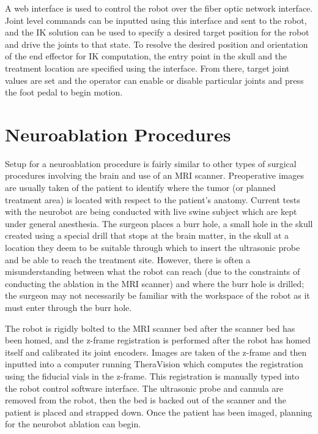 \documentclass[12pt]{report}
\makeatletter
\renewcommand{\todo}[2][]{%
    \@todo[caption={#2}, #1]{\begin{spacing}{0.5}#2\end{spacing}}%
}
\makeatother
\begin{document}
A web interface is used to control the robot over the fiber optic network interface. Joint level commands can be inputted using this interface and sent to the robot, and the IK solution can be used to specify a desired target position for the robot and drive the joints to that state. To resolve the desired position and orientation of the end effector for IK computation, the entry point in the skull and the treatment location are specified using the interface. From there, target joint values are set and the operator can enable or disable particular joints and press the foot pedal to begin motion.


\section{Neuroablation Procedures}
\label{sec:neuroablationProcedures}
Setup for a neuroablation procedure is fairly similar to other types of surgical procedures involving the brain and use of an MRI scanner. Preoperative images are usually taken of the patient to identify where the tumor (or planned treatment area) is located with respect to the patient's anatomy. Current tests with the neurobot are being conducted with live swine subject which are kept under general anesthesia. The surgeon places a burr hole, a small hole in the skull created using a special drill that stops at the brain matter, in the skull at a location they deem to be suitable through which to insert the ultrasonic probe and be able to reach the treatment site. However, there is often a misunderstanding between what the robot can reach (due to the constraints of conducting the ablation in the MRI scanner) and where the burr hole is drilled; the surgeon may not necessarily be familiar with the workspace of the robot as it must enter through the burr hole. \todo{GF: please word this [sentence] differently}

The robot is rigidly bolted to the MRI scanner bed after the scanner bed has been homed, and the z-frame registration is performed after the robot has homed itself and calibrated its joint encoders. Images are taken of the z-frame and then inputted into a computer running TheraVision which computes the registration using the fiducial vials in the z-frame. This registration is manually typed into the robot control software interface. The ultrasonic probe and cannula are removed from the robot, then the bed is backed out of the scanner and the patient is placed and strapped down. Once the patient has been imaged, planning for the neurobot ablation can begin.
\end{document}
